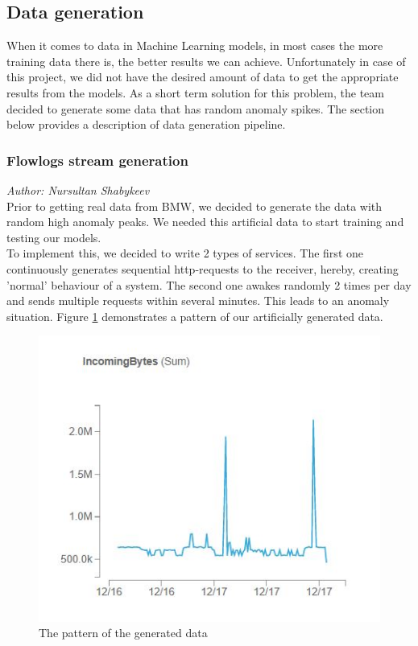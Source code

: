         \subsection{Data generation}
        \label{sec:data_generation}
        When it comes to data in Machine Learning models, in most cases the more training data there is, the better results we can achieve. Unfortunately in case of this project, we did not have the desired amount of data to get the appropriate results from the models. As a short term solution for this problem, the team decided to generate some data that has random anomaly spikes. The section below provides a description of data generation pipeline. \\
        \subsubsection{Flowlogs stream generation}\label{flowlogs-stream-generation}
        \textit{Author: Nursultan Shabykeev} \\
        
        Prior to getting real data from BMW, we decided to generate the data with random high anomaly peaks. We needed this artificial data to start training and testing our models.\\
        To implement this, we decided to write 2 types of services. The first one continuously generates sequential http-requests to the receiver, hereby, creating 'normal' behaviour of a system. The second one awakes randomly 2 times per day and sends multiple requests within several minutes. This leads to an anomaly situation. Figure \ref{fig:data-generation} demonstrates a pattern of our artificially generated data.
        
         \begin{figure}[h]
            \centering
            \includegraphics{images/data-generation.jpg}
            \caption{The pattern of the generated data}
            \label{fig:data-generation}
        \end{figure}
        \FloatBarrier
        
